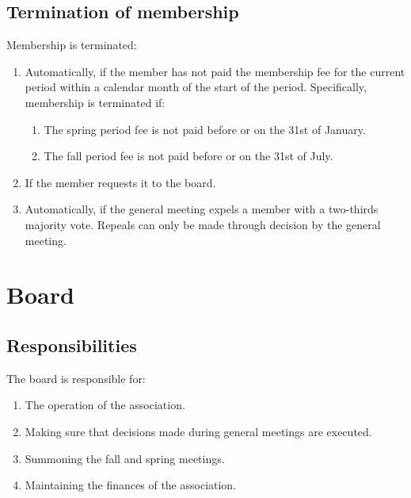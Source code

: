 \subsection{Termination of membership} \label{sec:membershipTermination}
Membership is terminated:
\begin{enumerate}
  \item Automatically, if the member has not paid the membership fee for the current period within a calendar month of the start of the period. Specifically, membership is terminated if:
  \begin{enumerate}
    \item The spring period fee is not paid before or on the 31st of January.
    \item The fall period fee is not paid before or on the 31st of July.
  \end{enumerate}
  \item If the member requests it to the board.
  \item Automatically, if the general meeting expels a member with a two-thirds majority vote. Repeals can only be made through decision by the general meeting.
\end{enumerate}

\section*{Board}
\subsection{Responsibilities}
The board is responsible for:
\begin{enumerate}
  \item The operation of the association.
  \item Making sure that decisions made during general meetings are executed.
  \item Summoning the fall and spring meetings. 
  \item Maintaining the finances of the association. 
\end{enumerate}

